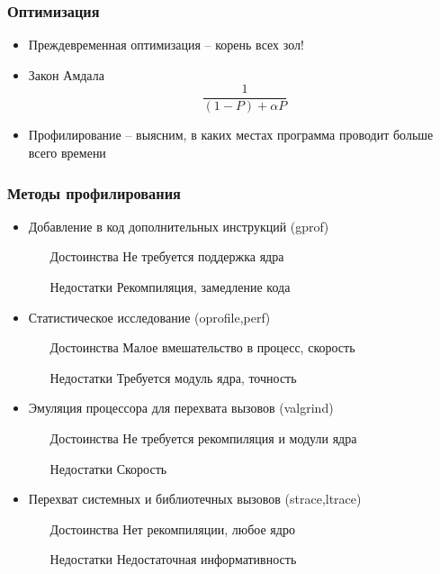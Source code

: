 \begin{frame}
 \frametitle{Оптимизация}
 \begin{itemize}
  \item Преждевременная оптимизация -- корень всех зол!
  \pause
  \item Закон Амдала
     \begin{equation*}
        \frac{1}{(1-P)+\alpha P}
     \end{equation*}
  \item Профилирование -- выясним, в каких местах программа проводит больше всего времени
 \end{itemize}
\end{frame}


\begin{frame}
  \frametitle{Методы профилирования}
  \begin{itemize}
    \item Добавление в код дополнительных инструкций (gprof)
      \begin{enumerate}
        \item[Достоинства] Не требуется поддержка ядра
        \item[Недостатки] Рекомпиляция, замедление кода
      \end{enumerate}
    \item Статистическое исследование (oprofile,perf)
      \begin{enumerate}
        \item[Достоинства] Малое вмешательство в процесс, скорость
        \item[Недостатки] Требуется модуль ядра, точность
      \end{enumerate}
    \item Эмуляция процессора для перехвата вызовов (valgrind)
       \begin{enumerate}
         \item[Достоинства] Не требуется рекомпиляция и модули ядра
         \item[Недостатки] Скорость
        \end{enumerate}
    \item Перехват системных и библиотечных вызовов (strace,ltrace)
       \begin{enumerate}
          \item[Достоинства] Нет рекомпиляции, любое ядро
          \item[Недостатки] Недостаточная информативность
       \end{enumerate}
  \end{itemize}
\end{frame}

